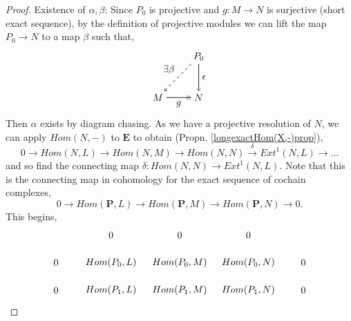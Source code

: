 \documentclass[11.5pt, twoside, a4paper, titlepage]{report}
\theoremstyle{definition}
\theoremstyle{plain}
\begin{document}
\begin{proof}
Existence of $\alpha, \beta$: Since $P_0$ is projective and $g: M\to N$ is surjective (short exact sequence), by the definition of projective modules we can lift the map $P_0 \to N$ to a map $\beta$ such that,
\begin{equation*}
\begin{tikzpicture}[->,-latex, auto, main path/.style={->, semithick}, main node/.style={}]
\node [main node]		(1) at (0,0)		{$M$};
\node [main node]		(2) at (1.5,0)	{$N$};
\node [main node]		(3) at (1.5, 1.5)	{$P_0$};

\draw (1) edge [->>, semithick] node [auto, swap] {$g$} (2);
\draw (3) edge [main path] node [auto] {$\epsilon$} (2);
\draw (3) edge [->, dashed, semithick] node [auto, swap] {$\exists \beta$} (1);
\end{tikzpicture}
\end{equation*}
Then $\alpha$ exists by diagram chasing.
As we have a projective resolution of $N$, we can apply $Hom(N,-)$ to $\mathbf{E}$ to obtain (Propn. \ref{longexactHom(X,-)prop}),
\begin{equation*}
0\xrightarrow{} Hom(N,L) \xrightarrow{} Hom(N,M) \xrightarrow{} Hom(N,N) \xrightarrow{\delta} Ext^1(N,L) \xrightarrow{} \dots
\end{equation*}
and so find the connecting map $\delta: Hom(N,N) \to Ext^1(N,L)$. Note that this is the connecting map in cohomology for the exact sequence of cochain complexes,
\begin{equation*}
0 \xrightarrow{} Hom(\mathbf{P},L) \xrightarrow{} Hom(\mathbf{P},M) \xrightarrow{} Hom(\mathbf{P},N) \xrightarrow{} 0.
\end{equation*}
This begins,
\begin{equation*}
\begin{tikzpicture}[->,-latex, auto, main path/.style={->, semithick}, main node/.style={}]
\node	[main node]		(2) at (0,0)		{$0$};
\node	[main node]		(3) at (2,0)		{$Hom(P_0, L)$};
\node [main node]		(4) at (4.5,0)	{$Hom(P_0,M)$};
\node [main node]		(5) at (7,0)		{$Hom(P_0, N)$};
\node	[main node]		(11) at (9,0)		{$0$};

\node	[main node]		(7) at (0,-1)		{$0$};
\node	[main node]		(8) at (2,-1)		{$Hom(P_1, L)$};
\node [main node]		(9) at (4.5,-1)	{$Hom(P_1, M)$};
\node [main node]		(10) at (7,-1)		{$Hom(P_1, N)$};
\node [main node]		(13) at (9,-1)	{$0$};

\node [main node]		(-1) at (2,1)		{$0$};
\node [main node]		(-2) at (4.5,1)	{$0$};
\node [main node]		(-3) at (7,1)		{$0$};


\end{tikzpicture}
\end{equation*}
\end{proof}
\end{document}
